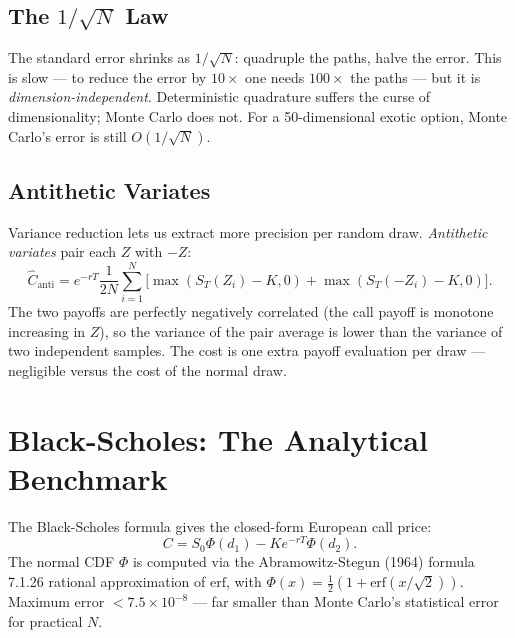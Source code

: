 \subsection{The $1/\sqrt{N}$ Law}

The standard error shrinks as $1/\sqrt{N}$: quadruple the paths, halve the
error. This is slow --- to reduce the error by $10\times$ one needs $100\times$
the paths --- but it is \emph{dimension-independent}. Deterministic quadrature
suffers the curse of dimensionality; Monte Carlo does not. For a
50-dimensional exotic option, Monte Carlo's error is still $O(1/\sqrt{N})$.

\subsection{Antithetic Variates}


Variance reduction lets us extract more precision per random draw.
\emph{Antithetic variates} pair each $Z$ with $-Z$:
\[
\hat{C}_{\text{anti}} = e^{-rT} \frac{1}{2N} \sum_{i=1}^N
\big[\max(S_T(Z_i) - K, 0) + \max(S_T(-Z_i) - K, 0)\big].
\]
The two payoffs are perfectly negatively correlated (the call payoff is
monotone increasing in $Z$), so the variance of the pair average is lower
than the variance of two independent samples. The cost is one extra payoff
evaluation per draw --- negligible versus the cost of the normal draw.

\section{Black-Scholes: The Analytical Benchmark}


The Black-Scholes formula gives the closed-form European call price:
\[
C = S_0 \Phi(d_1) - K e^{-rT} \Phi(d_2).
\]
The normal CDF $\Phi$ is computed via the Abramowitz-Stegun (1964) formula
7.1.26 rational approximation of $\text{erf}$, with $\Phi(x) = \tfrac{1}{2}(1 +
\text{erf}(x/\sqrt{2}))$. Maximum error $< 7.5 \times 10^{-8}$ --- far smaller
than Monte Carlo's statistical error for practical $N$.


